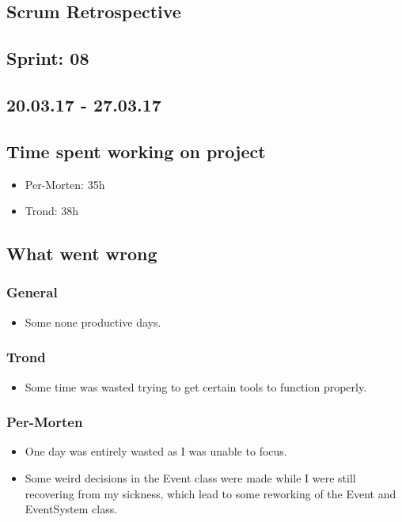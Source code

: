 \documentclass{article}
\begin{document}
\begin{center}
\section*{Scrum Retrospective}
\subsection*{Sprint: 08}
\subsection*{20.03.17 - 27.03.17}
\end{center}
\bigskip

\subsection*{Time spent working on project}
\begin{itemize}
    \item
    Per-Morten: 35h 

    \item
    Trond:      38h
\end{itemize}

\subsection*{What went wrong}
\subsubsection*{General}
\begin{itemize}
    \item
    Some none productive days.
\end{itemize}

\subsubsection*{Trond}
\begin{itemize}
    \item 
    Some time was wasted trying to get certain tools to function properly.
\end{itemize}

\subsubsection*{Per-Morten}
\begin{itemize}
    \item
    One day was entirely wasted as I was unable to focus.

    \item
    Some weird decisions in the Event class were made while I were still recovering from my sickness,
    which lead to some reworking of the Event and EventSystem class.
\end{itemize}
\end{document}

